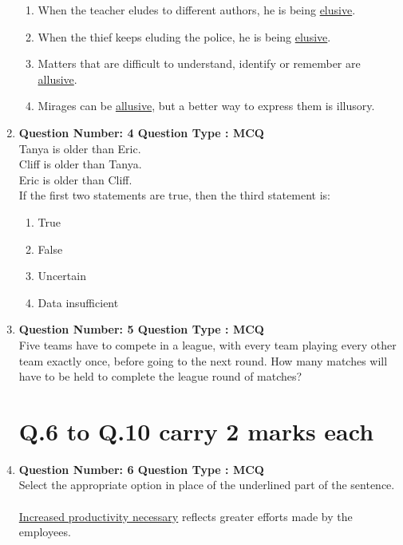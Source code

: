 \documentclass[journal]{IEEEtran}
\numberwithin{equation}{enumi}
\numberwithin{figure}{enumi}
\begin{document}
\begin{enumerate}
\begin{enumerate}
    \item When the teacher eludes to different authors, he is being \underline{elusive}.
    \item When the thief keeps eluding the police, he is being \underline{elusive}.
    \item Matters that are difficult to understand, identify or remember are \underline{allusive}.
    \item Mirages can be \underline{allusive}, but a better way to express them is illusory.
\end{enumerate}
\bigskip
\item \textbf{Question Number: 4 Question Type : MCQ}\\
Tanya is older than Eric. \\
Cliff is older than Tanya. \\
Eric is older than Cliff. \\

 \setlength\parindent{24pt} If the first two statements are true, then the third statement is: \\

\begin{enumerate}
    \item True
    \item False
    \item Uncertain
    \item Data insufficient
\end{enumerate}
\bigskip
\item \textbf{Question Number: 5 Question Type : MCQ}\\
Five teams have to compete in a league, with every team playing every other team exactly once, before going to the next round. How many matches will have to be held to complete the league round of matches? \\

\begin{enumerate}
\end{enumerate}
\bigskip
\section*{Q.6 to Q.10 carry 2 marks each}
\item \textbf{Question Number: 6 Question Type : MCQ}\\
Select the appropriate option in place of the underlined part of the sentence. \\
\\
\underline{Increased productivity necessary} reflects greater efforts made by the employees. \\


\end{enumerate}
\end{document}
